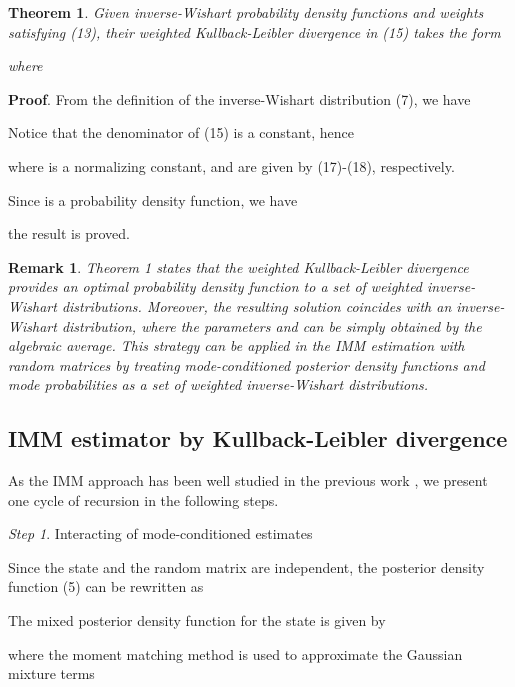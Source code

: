 \documentclass[12pt,draftcls,onecolumn]{IEEEtran}
\newtheorem{theorem}{Theorem}
\newtheorem{remark}{Remark}
\begin{document}
\begin{theorem}
Given  inverse-Wishart probability density functions
 and weights  satisfying (13),
their weighted Kullback-Leibler divergence in (15) takes the form

where

\end{theorem}


\textbf{Proof}. From the definition of the inverse-Wishart
distribution (7), we have




Notice that the denominator of (15) is a constant, hence

where  is a normalizing constant,  and  are
given by (17)-(18), respectively.


Since  is a probability density function, we have

the result is proved. 


\begin{remark}
Theorem 1 states that the weighted Kullback-Leibler divergence
provides an optimal probability density function to a set of
weighted inverse-Wishart distributions. Moreover, the resulting
solution coincides with an inverse-Wishart distribution, where the
parameters  and  can be simply obtained by the
algebraic average. This strategy can be applied in the IMM
estimation with random matrices by treating mode-conditioned
posterior density functions and mode probabilities as a set of
weighted inverse-Wishart distributions.
\end{remark}

\subsection{IMM estimator by Kullback-Leibler divergence}


As the IMM approach has been well studied in the previous work
\cite{1988imm,ourwork1,ourwork2}, we present one cycle of recursion
in the following steps.


\emph{Step 1}. Interacting of mode-conditioned estimates


Since the state  and the random matrix  are
independent, the posterior density function (5) can be rewritten as



The mixed posterior density function for the state  is
given by

where the moment matching method is used to approximate the Gaussian
mixture terms
\end{document}
